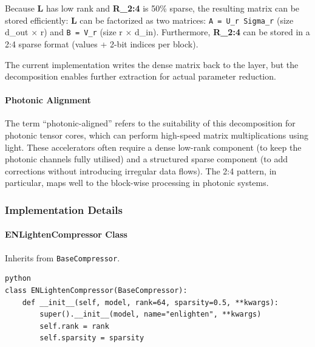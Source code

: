 Because \textbf{L} has low rank and \textbf{R\_2:4} is 50\% sparse, the resulting matrix can be stored efficiently:
\textbf{L} can be factorized as two matrices: \texttt{A = U\_r Sigma\_r} (size d\_out $\times$ r) and \texttt{B = V\_r} (size r $\times$ d\_in). Furthermore, \textbf{R\_2:4} can be stored in a 2:4 sparse format (values + 2-bit indices per block).


The current implementation writes the dense matrix back to the layer, but the decomposition enables further extraction for actual parameter reduction.

\paragraph{Photonic Alignment}

The term ``photonic-aligned'' refers to the suitability of this decomposition for photonic tensor cores, which can perform high-speed matrix multiplications using light. These accelerators often require a dense low-rank component (to keep the photonic channels fully utilised) and a structured sparse component (to add corrections without introducing irregular data flows). The 2:4 pattern, in particular, maps well to the block-wise processing in photonic systems.


\subsubsection*{Implementation Details}

\paragraph{ENLightenCompressor Class}

Inherits from \texttt{BaseCompressor}.

\vspace{0.5em}
\begin{mdframed}[backgroundcolor=codebg, linecolor=codeframe, linewidth=1pt, roundcorner=4pt, innerleftmargin=2pt, innerrightmargin=5pt, innertopmargin=5pt, innerbottommargin=5pt]
\begin{lstlisting}
python
class ENLightenCompressor(BaseCompressor):
    def __init__(self, model, rank=64, sparsity=0.5, **kwargs):
        super().__init__(model, name="enlighten", **kwargs)
        self.rank = rank
        self.sparsity = sparsity
\end{lstlisting}
\end{mdframed}
\vspace{0.5em}

